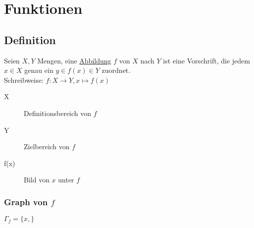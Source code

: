 \chapter{Funktionen}
\section{Definition}
Seien $X, Y$ Mengen, eine \ul{Abbildung} $f$ von $X$ nach $Y$ ist eine Vorschrift, die jedem $x \in X$ genau ein $y\in f(x) \in Y$ zuordnet.\\
Schreibweise: $f: X \to Y, x \mapsto f(x)$\\
\begin{description}
	\item[X] Definitionsbereich von $f$
	\item[Y] Zielbereich von $f$
	\item[f(x)] Bild von $x$ unter $f$
\end{description}
\subsection*{Graph von $f$}
$\Gamma_f = \{x, \}$